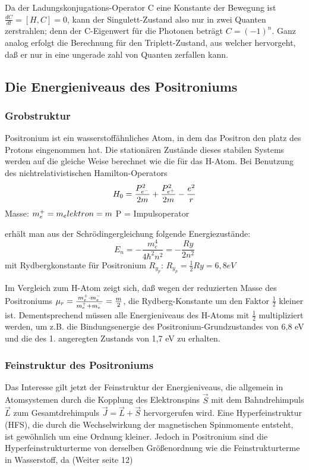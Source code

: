 Da der Ladungskonjugations-Operator C eine Konstante der Bewegung ist $ \frac{dC}{dt} = [H, C] = 0$, kann der Singulett-Zustand also nur in zwei Quanten zerstrahlen; denn der C-Eigenwert für die Photonen beträgt $C = (-1)^n$. Ganz analog erfolgt die Berechnung für den Triplett-Zustand, aus welcher hervorgeht, daß er nur in eine ungerade zahl von Quanten zerfallen kann.

\subsection{Die Energieniveaus des Positroniums}

\subsubsection{Grobstruktur}

Positronium ist ein wasserstoffähnliches Atom, in dem das Positron den platz des Protons eingenommen hat. Die stationären Zustände dieses stabilen Systems werden auf die gleiche Weise berechnet wie die für das H-Atom.
Bei Benutzung des nichtrelativistischen Hamilton-Operators
\begin{equation*}
 H_0 = \frac{P_{e^-}^2}{2m} + \frac{P_{e^+}^2}{2m} - \frac{e^2}{r}
\end{equation*}
Masse: $m_\positron = m_elektron = m$
P = Impulsoperator

erhält man aus der Schrödingergleichung folgende Energiezustände:
\begin{equation*}
 E_n = - \frac{m_e^4}{4 \hbar^2 n^2} = - \frac{Ry}{2 n^2}
\end{equation*}
mit Rydbergkonstante für Positronium $R_{y_p}$: $R_{y_p} = \frac{1}{2} Ry = 6,8 eV$

Im Vergleich zum H-Atom zeigt sich, daß wegen der reduzierten Masse des Positroniums $\mu_r = \frac{m_\positron \cdot m_\elektron}{m_\positron + m_\elektron} = \frac{m}{2}$, die Rydberg-Konstante um den Faktor $\frac{1}{2}$ kleiner ist. Dementsprechend müssen alle Energieniveaus des H-Atoms mit $\frac{1}{2}$ multipliziert werden, um z.B. die Bindungsenergie des Positronium-Grundzustandes von 6,8 eV und die des 1. angeregten Zustands von 1,7 eV zu erhalten.

\subsubsection{Feinstruktur des Positroniums}

Das Interesse gilt jetzt der Feinstruktur der Energieniveaus, die allgemein in Atomsystemen durch die Kopplung des Elektronspins $\vec{S}$ mit dem Bahndrehimpuls $\vec{L}$ zum Gesamtdrehimpuls $\vec{J} = \vec{L} + \vec{S}$ hervorgerufen wird. Eine Hyperfeinstruktur (HFS), die durch die Wechselwirkung der magnetischen Spinmomente entsteht, ist gewöhnlich um eine Ordnung kleiner. Jedoch in Positronium sind die Hyperfeinstrukturterme von derselben Größenordnung wie die Feinstrukturterme in Wasserstoff, da (Weiter seite 12)